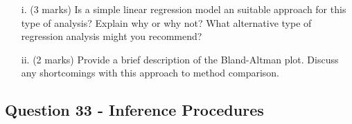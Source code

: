 \documentclass[a4paper,12pt]{article}
\begin{document}
\begin{itemize}
	\item[i.] (3 marks) Is a simple linear regression model an suitable approach for this type of analysis? Explain why or why not? What alternative type of regression analysis might you recommend?
	\item[ii.] (2 marks) Provide a brief description of the Bland-Altman plot. Discuss any shortcomings with this approach to method comparison.
\end{itemize}


\subsection*{Question 33 - Inference Procedures}
\end{document}
